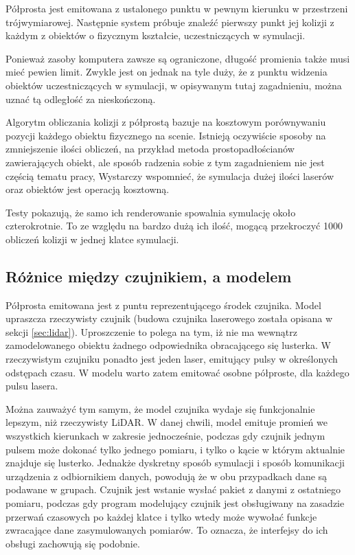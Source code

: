 		Półprosta jest emitowana z ustalonego punktu w pewnym kierunku w przestrzeni trójwymiarowej.
		Następnie system próbuje znaleźć pierwszy punkt jej kolizji z każdym z obiektów o fizycznym kształcie, uczestniczących w symulacji.
		
		Ponieważ zasoby komputera zawsze są ograniczone, długość promienia także musi mieć pewien limit. 
		Zwykle jest on jednak na tyle duży, że z punktu widzenia obiektów uczestniczących w symulacji, w opisywanym tutaj zagadnieniu, 
		można uznać tą odległość za nieskończoną.

		Algorytm obliczania kolizji z półprostą bazuje na kosztowym porównywaniu pozycji każdego obiektu fizycznego na scenie.
		Istnieją oczywiście sposoby na zmniejszenie ilości obliczeń, na przykład metoda prostopadłościanów zawierających obiekt, ale sposób radzenia sobie z tym zagadnieniem nie jest
		częścią tematu pracy,
		Wystarczy wspomnieć, że symulacja dużej ilości laserów oraz obiektów jest operacją kosztowną.
		
		Testy pokazują, że samo ich renderowanie spowalnia symulację około czterokrotnie.
		To ze względu na bardzo dużą ich ilość, mogącą przekroczyć 1000 obliczeń kolizji w jednej klatce symulacji.

	\subsection{Różnice między czujnikiem, a modelem}
		Półprosta emitowana jest z puntu reprezentującego środek czujnika.
		Model upraszcza rzeczywisty czujnik (budowa czujnika laserowego została opisana w sekcji \ref{sec:lidar}).
		Uproszczenie to polega na tym, iż nie ma wewnątrz zamodelowanego obiektu żadnego odpowiednika obracającego się lusterka.
		W rzeczywistym czujniku ponadto jest jeden laser, emitujący pulsy w określonych odstępach czasu.
		W modelu warto zatem emitować osobne półproste, dla każdego pulsu lasera.

		Można zauważyć tym samym, że model czujnika wydaje się funkcjonalnie lepszym, niż rzeczywisty LiDAR.
		W danej chwili, model emituje promień we wszystkich kierunkach w zakresie jednocześnie, podczas gdy czujnik jednym pulsem może dokonać tylko jednego pomiaru,
		i tylko o kącie w którym aktualnie znajduje się lusterko.
		Jednakże dyskretny sposób symulacji i sposób komunikacji urządzenia z odbiornikiem danych, powodują że w obu przypadkach dane są podawane w grupach.
		Czujnik jest wstanie wysłać pakiet z danymi z ostatniego pomiaru, podczas gdy program modelujący czujnik jest obsługiwany na zasadzie przerwań czasowych 
		po każdej klatce i tylko wtedy może wywołać funkcje zwracające dane zasymulowanych pomiarów.
		To oznacza, że interfejsy do ich obsługi zachowują się podobnie.

